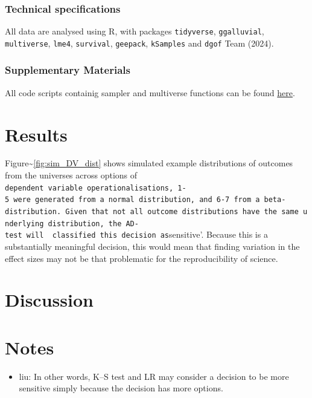 \documentclass[
  letterpaper,
  DIV=11,
  numbers=noendperiod]{scrartcl}
\providecommand{\tightlist}{%
  \setlength{\itemsep}{0pt}\setlength{\parskip}{0pt}}
\begin{document}
\subsubsection{Technical specifications}\label{technical-specifications}

All data are analysed using R, with packages \texttt{tidyverse},
\texttt{ggalluvial}, \texttt{multiverse}, \texttt{lme4},
\texttt{survival}, \texttt{geepack}, \texttt{kSamples} and \texttt{dgof}
Team (2024).

\subsubsection{Supplementary Materials}\label{supplementary-materials}

All code scripts containig sampler and multiverse functions can be found
\href{https://github.com/lodewijn/ManyAnalystThesisCompendium}{here}.

\section{Results}\label{results}

Figure\textasciitilde{}\ref{fig:sim_DV_dist} shows simulated example
distributions of outcomes from the universes across options of
\texttt{dependent\ variable\ operationalisations\textquotesingle{},\ 1-5\ were\ generated\ from\ a\ normal\ distribution,\ and\ 6-7\ from\ a\ beta-distribution.\ Given\ that\ not\ all\ outcome\ distributions\ have\ the\ same\ underlying\ distribution,\ the\ AD-test\ will\ \ classified\ this\ decision\ as}sensitive'.
Because this is a substantially meaningful decision, this would mean
that finding variation in the effect sizes may not be that problematic
for the reproducibility of science.

\section{Discussion}\label{discussion}

\section{Notes}\label{notes}

\begin{itemize}
\tightlist
\item
  liu: In other words, K--S test and LR may consider a decision to be
  more sensitive simply because the decision has more options.
\end{itemize}
\end{document}
